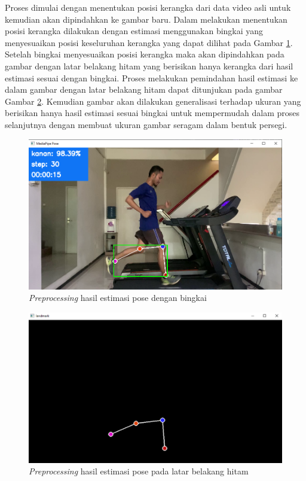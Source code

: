 Proses dimulai dengan menentukan posisi kerangka dari data video asli untuk kemudian akan dipindahkan ke gambar baru. Dalam melakukan menentukan posisi kerangka dilakukan dengan estimasi menggunakan bingkai yang menyesuaikan posisi keseluruhan kerangka yang dapat dilihat pada Gambar \ref{fig:PreProcessing1}. Setelah bingkai menyesuaikan posisi kerangka maka akan dipindahkan pada gambar dengan latar belakang hitam yang berisikan hanya kerangka dari hasil estimasi sesuai dengan bingkai. Proses melakukan pemindahan hasil estimasi ke dalam gambar dengan latar belakang hitam dapat ditunjukan pada gambar Gambar \ref{fig:PreProcessing2}. Kemudian gambar akan dilakukan generalisasi terhadap ukuran yang berisikan hanya hasil estimasi sesuai bingkai untuk mempermudah dalam proses selanjutnya dengan membuat ukuran gambar seragam dalam bentuk persegi.

\begin{figure}[H]
  \centering
  \includegraphics[scale=0.48]{gambar/deteksi pose2.png}
  \caption{\emph{Preprocessing} hasil estimasi pose dengan bingkai}
  \label{fig:PreProcessing1}
\end{figure}

\begin{figure}[H]
  \centering
  \includegraphics[scale=0.8]{gambar/deteksi pose3.png}
  \caption{\emph{Preprocessing} hasil estimasi pose pada latar belakang hitam}
  \label{fig:PreProcessing2}
\end{figure}

